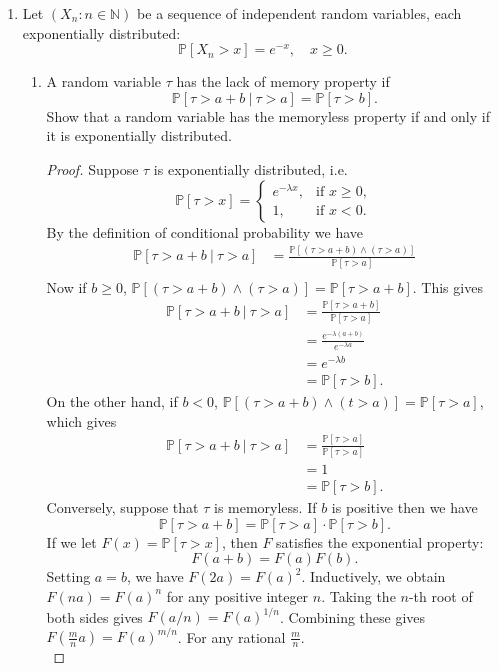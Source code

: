 \documentclass[11pt,letterpaper]{report}
\newcommand{\naturals}{\mathbb{N}}
\newcommand{\prob}{\mathbb{P}}
\begin{document}
\begin{enumerate}
	\item Let $(X_n: n\in \naturals)$ be a sequence of independent random variables, each exponentially distributed:
	\[
	\prob[X_n>x] =e^{-x},\quad x\geq 0.
	\]
	\begin{enumerate}
		\item A random variable $\tau$ has the lack of memory property if
		\[
		\prob[\tau>a+b\ |\ \tau>a] = \prob[\tau>b].
		\]
		Show that a random variable has the memoryless property if and only if it is exponentially distributed.
		\begin{proof}
			Suppose $\tau$ is exponentially distributed, i.e.
			\[
			\prob[\tau > x] = \begin{cases}
				e^{-\lambda x},&\text{if }x\geq 0,\\
				1,&\text{if }x <0.
			\end{cases}
			\]
			By the definition of conditional probability we have 
			\begin{align*}
				\prob[\tau>a+b\ |\ \tau > a] &= \frac{\prob[(\tau>a+b) \land (\tau>a)]}{\prob[\tau>a]}\\
			\end{align*}
			Now if $b\geq 0$, $\prob[(\tau>a+b)\land (\tau>a)] = \prob[\tau>a+b]$. This gives
			\begin{align*}
				\prob[\tau>a+b\ |\ \tau > a] &= \frac{\prob[\tau>a+b]}{\prob[\tau>a]}\\
				&= \frac{e^{-\lambda(a+b)}}{e^{-\lambda a}}\\
				&= e^{-\lambda b}\\
				&= \prob[\tau>b].
			\end{align*}
			On the other hand, if $b<0$, $\prob[(\tau>a+b)\land(t>a)] = \prob[\tau>a]$, which gives
			\begin{align*}
				\prob[\tau>a+b\ |\ \tau > a] &=\frac{\prob[\tau>a]}{\prob[\tau>a]}\\
				&= 1\\
				&= \prob[\tau>b].
			\end{align*}
			Conversely, suppose that $\tau$ is memoryless. If $b$ is positive then we have
			\[
			\prob[\tau>a+b] = \prob[\tau>a]\cdot \prob[\tau>b].
			\]
			If we let $F(x)= \prob[\tau>x]$, then $F$ satisfies the exponential property:
			\[
			F(a+b) = F(a)F(b).
			\]
			Setting $a=b$, we have $F(2a) = F(a)^2$. Inductively, we obtain $F(na) = F(a)^n$ for any positive integer $n$. Taking the $n$-th root of both sides gives $F(a/n) = F(a)^{1/n}$. Combining these gives $F(\frac{m}{n}a) = F(a)^{m/n}$. For any rational $\frac{m}{n}$.\\


\end{proof}
\end{enumerate}
\end{enumerate}
\end{document}
